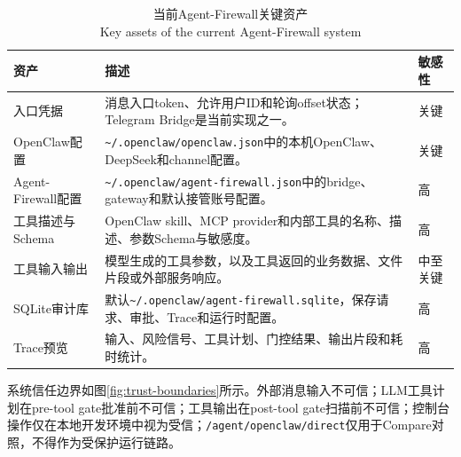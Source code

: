 \documentclass[UTF8,zihao=-4,scheme=chinese,fontset=none]{ctexart}
\newcommand{\code}[1]{{\ttfamily\small\nolinkurl{#1}}}
\newcommand{\bicaption}[2]{\caption{#1\\\small #2}}
\begin{document}
\begin{table}[tbp]
  \centering
  \bicaption{当前Agent-Firewall关键资产}{Key assets of the current Agent-Firewall system}
  \label{tab:assets}
  \small
  \begin{tabularx}{\textwidth}{p{3.0cm}Yp{2.2cm}}
    \toprule
    资产 & 描述 & 敏感性 \\
    \midrule
    入口凭据 & 消息入口token、允许用户ID和轮询offset状态；Telegram Bridge是当前实现之一。 & 关键 \\
    OpenClaw配置 & \code{~/.openclaw/openclaw.json}中的本机OpenClaw、DeepSeek和channel配置。 & 关键 \\
    Agent-Firewall配置 & \code{~/.openclaw/agent-firewall.json}中的bridge、gateway和默认接管账号配置。 & 高 \\
    工具描述与Schema & OpenClaw skill、MCP provider和内部工具的名称、描述、参数Schema与敏感度。 & 高 \\
    工具输入输出 & 模型生成的工具参数，以及工具返回的业务数据、文件片段或外部服务响应。 & 中至关键 \\
    SQLite审计库 & 默认\code{~/.openclaw/agent-firewall.sqlite}，保存请求、审批、Trace和运行时配置。 & 高 \\
    Trace预览 & 输入、风险信号、工具计划、门控结果、输出片段和耗时统计。 & 高 \\
    \bottomrule
  \end{tabularx}
\end{table}

系统信任边界如图\ref{fig:trust-boundaries}所示。外部消息输入不可信；LLM工具计划在pre-tool gate批准前不可信；工具输出在post-tool gate扫描前不可信；控制台操作仅在本地开发环境中视为受信；\code{/agent/openclaw/direct}仅用于Compare对照，不得作为受保护运行链路。
\end{document}
